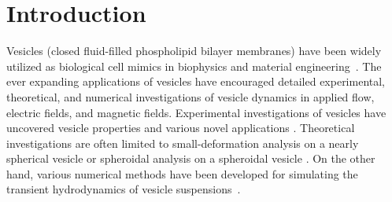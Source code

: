 \documentclass[prf,superscriptaddress,showkeys]{revtex4-1}
\begin{document}
\maketitle



\section{Introduction}
Vesicles (closed fluid-filled phospholipid bilayer membranes) have been
widely utilized as biological cell mimics in biophysics and material
engineering~\cite{sackmann1996, FenzSengupta2012_IntegrBiol,Barthes-Biesel2016_ARFM}.  The ever
expanding applications of vesicles have encouraged detailed experimental,
theoretical, and numerical investigations of vesicle dynamics in
applied flow, electric fields, and magnetic fields.  
Experimental investigations of vesicles have uncovered vesicle properties and various novel applications
\cite{Dobereiner2000_CurrentOpinionCIS,EvansRawiczSmith2013_FaradayDiscussions,SugiyamaToyota2018_Life}. 
Theoretical investigations are often limited to small-deformation analysis on a nearly spherical vesicle
or spheroidal analysis on a spheroidal vesicle \cite{Barthes-BieselRallison1981_JFM, Misbah2006_PRL,
Vlahovska2007_PRE, Finken2008_EPL, ZhangZahnTanLin2013_PoF,
Nganguia2013_PRE}.  On the other hand, various numerical methods have
been developed for simulating the transient hydrodynamics of vesicle
suspensions~\cite{BagchiJohoson2005_JBE, Biben2005_EJP,
Veerapaneni2009_JCP, SeolHuKimLai2016_JCP}.  
\end{document}

